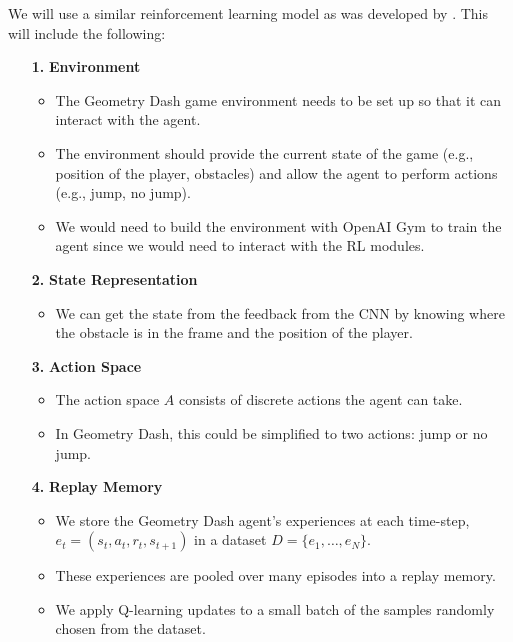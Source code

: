 \documentclass{article} %
\begin{document}
We will use a similar reinforcement learning model as was developed by 
\cite{Playing+Atari+with+Deep+Reinforcement+Learning}. This will include
the following:

\begin{itemize}
    \item[\textbf{1.}] \textbf{Environment}
    \begin{itemize}
        \item The Geometry Dash game environment needs to be set up so that it 
        can interact with the agent. 
        \item The environment should provide the current state of the game 
        (e.g., position of the player, obstacles) and allow the agent to perform 
        actions (e.g., jump, no jump).
        \item We would need to build the environment with OpenAI Gym to train 
        the agent since we would need to interact with the RL modules.
    \end{itemize}

    \item[\textbf{2.}] \textbf{State Representation}
    \begin{itemize}
        \item We can get the state from the feedback from the CNN by knowing 
        where the obstacle is in the frame and the position of the player.
    \end{itemize}

    \item[\textbf{3.}] \textbf{Action Space}
    \begin{itemize}
        \item The action space \( A \) consists of discrete actions the agent 
        can take. 
        \item In Geometry Dash, this could be simplified to two actions: jump 
        or no jump.
    \end{itemize}

    \item[\textbf{4.}] \textbf{Replay Memory}
    \begin{itemize}
        \item We store the Geometry Dash agent’s experiences at each time-step, 
        \( e_t = (s_t, a_t, r_t, s_{t+1}) \) in a dataset \( D = \{e_1, \ldots, e_N\} \).
        \item These experiences are pooled over many episodes into a replay memory.
        \item We apply Q-learning updates to a small batch of the samples 
        randomly chosen from the dataset.
    \end{itemize}


\end{itemize}
\end{document}
